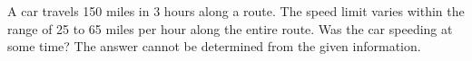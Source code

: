 {A car travels 150 miles in 3 hours along a route.  The speed limit varies within the range of 25 to 65 miles per hour along the entire route.  Was the car speeding at some time?
}
{The answer cannot be determined from the given information.
}
